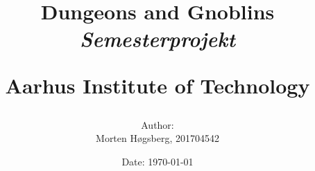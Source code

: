\newcommand{\authorName}{Morten Høgsberg}
\newcommand{\titleName}{Dungeons and Gnoblins}
\newcommand{\subject}{Semesterprojekt}
\newcommand{\institute}{Aarhus Institute of Technology}
\begin{titlepage}
  \centering
    \title
    {
      \Huge \textbf{\titleName}\\
      \scale{\numberSQRTTWO}{\vspace{\sol pt}}
      \LARGE \textit{\subject}
      \scale{\numberSQRTTWO}{\rule{\linewidth}{\sol pt}}

      \textbf{\institute}
      \author
    {
      \LARGE Author: \\
      Morten Høgsberg, 201704542 \\ 
    }
      \date{\LARGE Date: \today}
    }
\end{titlepage}
